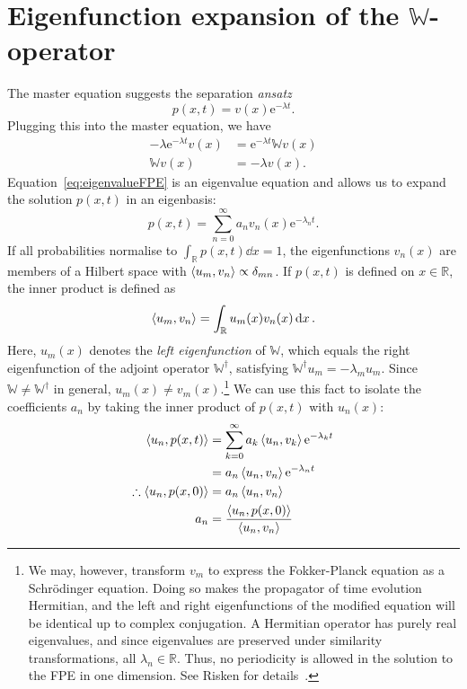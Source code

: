 \documentclass[hyperref={colorlinks=true, urlcolor=blue, citecolor=blue, final, bound}]{sfuthesis}
\newcommand{\e}{\mathrm{e}}
\begin{document}
\section{Eigenfunction expansion of the $\mathbb{W}$-operator}
The master equation suggests the separation \textit{ansatz} 
\begin{equation}
    p(x,t) = v(x)\e^{-\lambda t}.\label{eq:separationAnsatz}
\end{equation}
Plugging this into the master equation, we have
\begin{align}
    -\lambda \e^{-\lambda t}v(x) &= \e^{-\lambda t}\mathbb W v(x)\\
    \mathbb W v(x) &= -\lambda v(x).\label{eq:eigenvalueFPE}
\end{align}
Equation~\ref{eq:eigenvalueFPE} is an eigenvalue equation and allows us to expand the solution $p(x,t)$ in an eigenbasis:
\begin{equation}
    p(x,t) = \sum_{n=0}^\infty a_n v_n(x)\e^{-\lambda_n t}.
\end{equation}
If all probabilities normalise to $\int_{\mathbb R} p(x,t)\dd{x} = 1$, the eigenfunctions $v_n(x)$ are members of a Hilbert space with $\ev{u_m,v_n} \propto \delta_{mn}$. If $p(x,t)$ is defined on $x\in\mathbb R$, the inner product is defined as
\begin{equation}
    \ev{u_m,v_n} = \int_{\mathbb R} u_m(x)v_n(x)\dd{x}.
\end{equation} 
Here, $u_m(x)$ denotes the \textit{left eigenfunction} of $\mathbb W$, which equals the right eigenfunction of the adjoint operator $\mathbb W^\dagger$, satisfying $\mathbb W^\dagger u_m = -\lambda_m u_m$. Since $\mathbb W\neq \mathbb W^\dagger$ in general, $u_m(x) \neq v_m(x)$.\footnote{We may, however, transform $v_m$ to express the Fokker-Planck equation as a Schr\"odinger equation. Doing so makes the propagator of time evolution Hermitian, and the left and right eigenfunctions of the modified equation will be identical up to complex conjugation. A Hermitian operator has purely real eigenvalues, and since eigenvalues are preserved under similarity transformations, all $\lambda_n\in\mathbb R$. Thus, no periodicity is allowed in the solution to the FPE in one dimension. See Risken for details~\cite{Risken1996}.} We can use this fact to isolate the coefficients $a_n$ by taking the inner product of $p(x,t)$ with $u_n(x)$:
\begin{align}
    \ev{u_n,p(x,t)} &= \sum_{k=0}^\infty a_k \ev{u_n,v_k}\e^{-\lambda_k t}\\
    &= a_n\ev{u_n,v_n}\e^{-\lambda_n t}\\
    \therefore \ev{u_n,p(x,0)} &= a_n\ev{u_n,v_n}\\
    a_n &= \frac{\ev{u_n,p(x,0)}}{\ev{u_n,v_n}}\label{eq:an}
\end{align}
\end{document}
